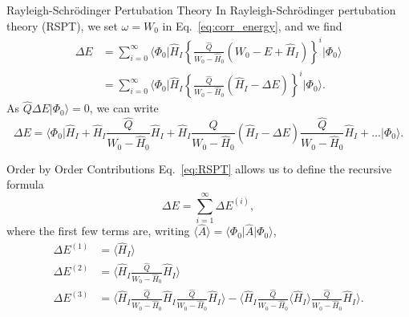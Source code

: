\documentclass[UKenglish,aspectratio=169]{beamer}
\begin{document}
\begin{frame}{Rayleigh-Schrödinger Pertubation Theory}
    In Rayleigh-Schrödinger pertubation theory (RSPT), we set $\omega = W_0$ in Eq.~\eqref{eq:corr_energy}, and we find
    \begin{equation}
        \begin{split}
            \Delta E &= \sum_{i = 0}^\infty \Big\langle \Phi_0 \big\vert \hat{H}_I \left\{
                \frac{\hat{Q}}{W_0 - \hat{H}_0} \left( W_0 - E + \hat{H}_I \right)
            \right\}^{i} \big\lvert \Phi_0 \Big\rangle \\
            &= \sum_{i = 0}^\infty \Big\langle \Phi_0 \big\vert \hat{H}_I \left\{
                \frac{\hat{Q}}{W_0 - \hat{H}_0} \left( \hat{H}_I - \Delta E \right)
            \right\}^{i} \big\lvert \Phi_0 \Big\rangle.
        \end{split}
    \end{equation}
    As $\hat{Q} \Delta E \vert \Phi_0 \rangle = 0$, we can write
    \begin{equation}\label{eq:RSPT}
        \Delta E = \Big\langle \Phi_0 \big\vert
        \hat{H}_I
        + \hat{H}_I \frac{\hat{Q}}{W_0 - \hat{H}_0} \hat{H}_I
        + \hat{H}_I \frac{\hat{Q}}{W_0 - \hat{H}_0} \left( \hat{H}_I - \Delta E \right) \frac{\hat{Q}}{W_0 - \hat{H}_0} \hat{H}_I
        + \ldots
        \big\vert \Phi_0 \Big\rangle.
    \end{equation}
\end{frame}

\begin{frame}{Order by Order Contributions}
    Eq.~\eqref{eq:RSPT} allows us to define the recursive formula
    \begin{equation}
        \Delta E = \sum_{i = 1}^\infty \Delta E^{(i)},
    \end{equation}
    where the first few terms are, writing $\langle \hat{A} \rangle = \langle \Phi_0 \vert \hat{A} \vert \Phi_0 \rangle$,
    \begin{align}
        \Delta E^{(1)} &= \Big\langle \hat{H}_I \Big\rangle \\
        \Delta E^{(2)} &= \Big\langle \hat{H}_I \frac{\hat{Q}}{W_0 - \hat{H}_0} \hat{H}_I \Big\rangle \\
        \Delta E^{(3)} &=
        \Big\langle
        \hat{H}_I \frac{\hat{Q}}{W_0 - \hat{H}_0}
        \hat{H}_I \frac{\hat{Q}}{W_0 - \hat{H}_0}
        \hat{H}_I
        \Big\rangle
        - \Big\langle
        \hat{H}_I \frac{\hat{Q}}{W_0 - \hat{H}_0}
        \Big\langle \hat{H}_I \Big\rangle
        \frac{\hat{Q}}{W_0 - \hat{H}_0} \hat{H}_I
        \Big\rangle.
    \end{align}
\end{frame}
\end{document}
